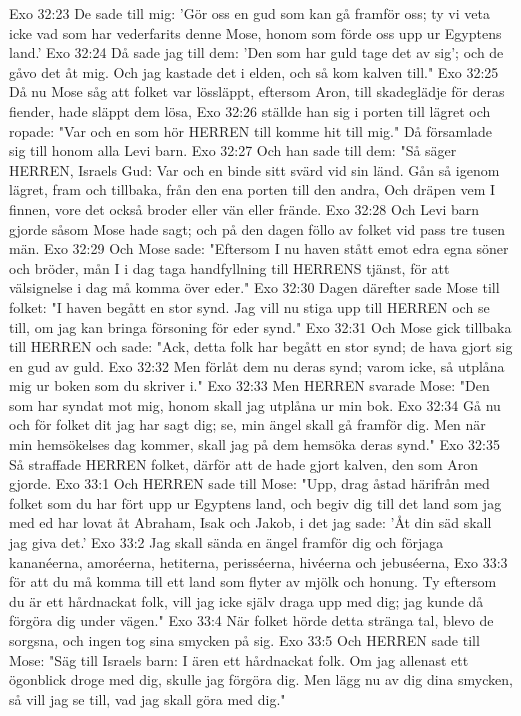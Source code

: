 Exo 32:23  De sade till mig: 'Gör oss en gud som kan gå framför oss; ty vi veta icke vad som har vederfarits denne Mose, honom som förde oss upp ur Egyptens land.'
Exo 32:24  Då sade jag till dem: 'Den som har guld tage det av sig'; och de gåvo det åt mig. Och jag kastade det i elden, och så kom kalven till."
Exo 32:25  Då nu Mose såg att folket var lössläppt, eftersom Aron, till skadeglädje för deras fiender, hade släppt dem lösa,
Exo 32:26  ställde han sig i porten till lägret och ropade: "Var och en som hör HERREN till komme hit till mig." Då församlade sig till honom alla Levi barn.
Exo 32:27  Och han sade till dem: "Så säger HERREN, Israels Gud: Var och en binde sitt svärd vid sin länd. Gån så igenom lägret, fram och tillbaka, från den ena porten till den andra, Och dräpen vem I finnen, vore det också broder eller vän eller frände.
Exo 32:28  Och Levi barn gjorde såsom Mose hade sagt; och på den dagen föllo av folket vid pass tre tusen män.
Exo 32:29  Och Mose sade: "Eftersom I nu haven stått emot edra egna söner och bröder, mån I i dag taga handfyllning till HERRENS tjänst, för att välsignelse i dag må komma över eder."
Exo 32:30  Dagen därefter sade Mose till folket: "I haven begått en stor synd. Jag vill nu stiga upp till HERREN och se till, om jag kan bringa försoning för eder synd."
Exo 32:31  Och Mose gick tillbaka till HERREN och sade: "Ack, detta folk har begått en stor synd; de hava gjort sig en gud av guld.
Exo 32:32  Men förlåt dem nu deras synd; varom icke, så utplåna mig ur boken som du skriver i."
Exo 32:33  Men HERREN svarade Mose: "Den som har syndat mot mig, honom skall jag utplåna ur min bok.
Exo 32:34  Gå nu och för folket dit jag har sagt dig; se, min ängel skall gå framför dig. Men när min hemsökelses dag kommer, skall jag på dem hemsöka deras synd."
Exo 32:35  Så straffade HERREN folket, därför att de hade gjort kalven, den som Aron gjorde.
Exo 33:1  Och HERREN sade till Mose: "Upp, drag åstad härifrån med folket som du har fört upp ur Egyptens land, och begiv dig till det land som jag med ed har lovat åt Abraham, Isak och Jakob, i det jag sade: 'Åt din säd skall jag giva det.'
Exo 33:2  Jag skall sända en ängel framför dig och förjaga kananéerna, amoréerna, hetiterna, perisséerna, hivéerna och jebuséerna,
Exo 33:3  för att du må komma till ett land som flyter av mjölk och honung. Ty eftersom du är ett hårdnackat folk, vill jag icke själv draga upp med dig; jag kunde då förgöra dig under vägen."
Exo 33:4  När folket hörde detta stränga tal, blevo de sorgsna, och ingen tog sina smycken på sig.
Exo 33:5  Och HERREN sade till Mose: "Säg till Israels barn: I ären ett hårdnackat folk. Om jag allenast ett ögonblick droge med dig, skulle jag förgöra dig. Men lägg nu av dig dina smycken, så vill jag se till, vad jag skall göra med dig."
